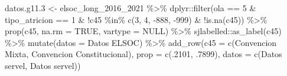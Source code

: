 \documentclass[
  12pt,
]{book}
\newenvironment{Shaded}{\begin{snugshade}}{\end{snugshade}}
\newcommand{\AttributeTok}[1]{\textcolor[rgb]{0.77,0.63,0.00}{#1}}
\newcommand{\ConstantTok}[1]{\textcolor[rgb]{0.00,0.00,0.00}{#1}}
\newcommand{\DecValTok}[1]{\textcolor[rgb]{0.00,0.00,0.81}{#1}}
\newcommand{\FloatTok}[1]{\textcolor[rgb]{0.00,0.00,0.81}{#1}}
\newcommand{\FunctionTok}[1]{\textcolor[rgb]{0.00,0.00,0.00}{#1}}
\newcommand{\NormalTok}[1]{#1}
\newcommand{\OtherTok}[1]{\textcolor[rgb]{0.56,0.35,0.01}{#1}}
\newcommand{\SpecialCharTok}[1]{\textcolor[rgb]{0.00,0.00,0.00}{#1}}
\newcommand{\StringTok}[1]{\textcolor[rgb]{0.31,0.60,0.02}{#1}}
\begin{document}
\begin{Shaded}
\begin{Highlighting}[]
\NormalTok{datos.g11}\FloatTok{.3} \OtherTok{\textless{}{-}}\NormalTok{ elsoc\_long\_2016\_2021 }\SpecialCharTok{\%\textgreater{}\%} 
\NormalTok{  dplyr}\SpecialCharTok{::}\FunctionTok{filter}\NormalTok{(ola }\SpecialCharTok{==} \DecValTok{5} \SpecialCharTok{\&}\NormalTok{ tipo\_atricion }\SpecialCharTok{==} \DecValTok{1} \SpecialCharTok{\&} \SpecialCharTok{!}\NormalTok{c45 }\SpecialCharTok{\%in\%} \FunctionTok{c}\NormalTok{(}\DecValTok{3}\NormalTok{, }\DecValTok{4}\NormalTok{, }\SpecialCharTok{{-}}\DecValTok{888}\NormalTok{, }\SpecialCharTok{{-}}\DecValTok{999}\NormalTok{) }\SpecialCharTok{\&} \SpecialCharTok{!}\FunctionTok{is.na}\NormalTok{(c45)) }\SpecialCharTok{\%\textgreater{}\%} 
  \FunctionTok{prop}\NormalTok{(c45, }\AttributeTok{na.rm =} \ConstantTok{TRUE}\NormalTok{, }\AttributeTok{vartype =} \ConstantTok{NULL}\NormalTok{) }\SpecialCharTok{\%\textgreater{}\%} 
\NormalTok{  sjlabelled}\SpecialCharTok{::}\FunctionTok{as\_label}\NormalTok{(c45) }\SpecialCharTok{\%\textgreater{}\%} 
  \FunctionTok{mutate}\NormalTok{(}\AttributeTok{datos =} \StringTok{\textquotesingle{}Datos ELSOC\textquotesingle{}}\NormalTok{) }\SpecialCharTok{\%\textgreater{}\%}
  \FunctionTok{add\_row}\NormalTok{(}\AttributeTok{c45 =} \FunctionTok{c}\NormalTok{(}\StringTok{\textquotesingle{}Convencion Mixta\textquotesingle{}}\NormalTok{, }\StringTok{\textquotesingle{}Convencion Constitucional\textquotesingle{}}\NormalTok{), }\AttributeTok{prop =} \FunctionTok{c}\NormalTok{(.}\DecValTok{2101}\NormalTok{, .}\DecValTok{7899}\NormalTok{), }\AttributeTok{datos =} \FunctionTok{c}\NormalTok{(}\StringTok{\textquotesingle{}Datos servel\textquotesingle{}}\NormalTok{, }\StringTok{\textquotesingle{}Datos servel\textquotesingle{}}\NormalTok{))}


\end{Highlighting}
\end{Shaded}
\end{document}
